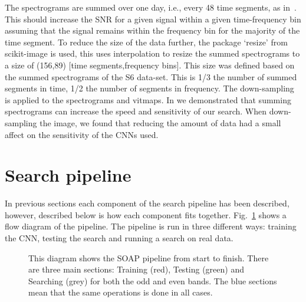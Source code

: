 %
The spectrograms are summed over one day, i.e., every 48 time segments, as
in~\cite{bayley2019SOAPGeneralised}. This should increase the \ac{SNR} for a
given signal within a given time-frequency bin assuming that the
signal remains within the frequency bin for the majority of the time segment.
To reduce the size of the data further, the package `resize' from scikit-image
\cite{vanderwalt2014ScikitimageImage} is used, this uses interpolation to
resize the summed spectrograms to a size of (156,89) [time segments,frequency
bins]. This size was defined based on the summed spectrograms of the S6 data-set. This is 1/3 the number of summed segments in time, 1/2 the number of segments in frequency. The down-sampling is applied to the
spectrograms and \acp{vitmap}. 
In \cite{bayley2019SOAPGeneralised} we demonstrated that summing spectrograms can increase the speed and sensitivity of our search.
When down-sampling the image, we found that reducing the amount of data had a small affect on the sensitivity of the \acp{CNN} used.

\section{\label{pipeline}Search pipeline}

In previous sections each component of the search pipeline has been described,
however, described below is how each component fits together. Fig.~\ref{pipeline:flow} shows a flow diagram of the pipeline. The pipeline is run in three different ways: training the \ac{CNN}, testing the search and running a search on real data. 

\begin{figure}[htp]
	\centering
	\scalebox{0.7}{
	}
	\caption{\label{pipeline:flow} This diagram shows the SOAP pipeline from start to finish. There are three main sections: Training (red), Testing (green) and Searching (grey) for both the odd and even bands. The blue sections mean that the same operations is done in all cases.}
	
\end{figure}

